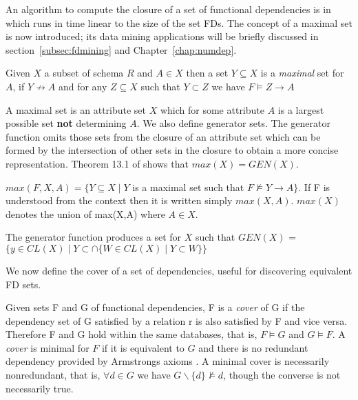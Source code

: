 An algorithm to compute the closure of a set of functional dependencies is in 
\cite{databasefound,atze93} which runs in time linear to the size of
the set FDs. The
concept of a maximal set is now introduced; its data mining
applications will be briefly discussed in
section~\ref{subsec:fdmining} and Chapter~\ref{chap:numdep}.

\begin{definition}
\begin{rm}
Given $X$ a subset of schema $R$ and $A \in X$ then
a set $Y \subseteq X$ is a {\em maximal} set for $A$, if $Y \not\to A$ and for any
$Z \subseteq X$ such that $Y \subset Z$ we have $F \models Z \to A$
\end{rm}
\end{definition}

A maximal set is an attribute set $X$ which for some attribute $A$ is
a largest possible set {\bf not} determining $A$. We also define
generator sets. The generator function omits those sets from the
closure of an attribute set which can be formed by the intersection of
other sets in the closure to obtain a more concise
representation. Theorem 13.1 of \cite{Mann92} shows that $max(X) = GEN(X)$.

\begin{definition}
\begin{rm}
$max(F,X,A) = \{ Y \subseteq X \mid Y$ is a maximal set such that
$F \not\models Y \to A \} $.  If F is understood from the context then it
is written simply $max(X,A)$. $max(X)$ denotes the union of max(X,A)
where $A \in X$.
\end{rm}
\end{definition}


\begin{definition}
\begin{rm}
The generator function produces a set for $X$ such that
$GEN(X)$ = $\{ y \in CL(X) \mid Y \subset \cap \{ W \in CL(X) \mid Y
\subset W \}\}$
\end{rm}
\end{definition}

We now define the cover of a set of dependencies, useful for
discovering equivalent FD sets.

\begin{definition}
\begin{rm}
Given sets F and G of functional dependencies, F is a {\em cover} of G if the 
dependency set of G satisfied by a relation r is also satisfied by F and vice versa. Therefore F and G hold within the same databases, that is, $F \models G$ and $G 
\models F$.
A {\em cover} is minimal for $F$ if it is equivalent to $G$ and there is no redundant dependency provided by Armstrongs axioms \cite{Arms74}. A minimal cover is necessarily nonredundant, that is, $\forall d \in G$ we have  $G \backslash \{ d \} \not\models d$, though the converse is not necessarily true.
\end{rm}
\end{definition}

